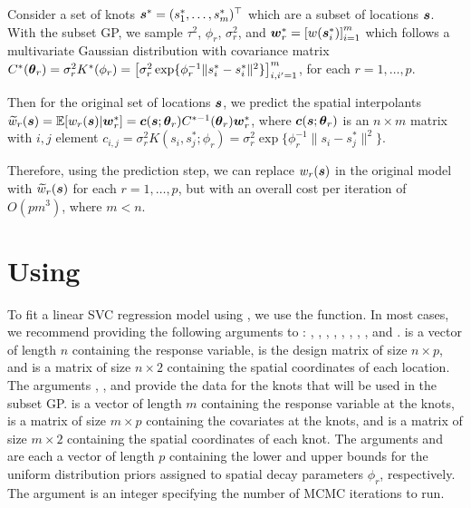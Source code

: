 Consider a set of knots $\boldsymbol{s}^* = (s_1^*, \dots, s_m^*)^\top$ which are a subset of locations $\boldsymbol{s}$. With the subset GP, we sample $\tau^2$, $\phi_r$, $\sigma_r^2$, and $\boldsymbol{w}_r^* = \left[w(\boldsymbol{s}_i^*)\right]_{i=1}^m$ which follows a multivariate Gaussian distribution with covariance matrix $C^*(\boldsymbol{\theta}_r) = \sigma_r^2 K^*(\phi_r) = \left[ \sigma_r^2 \exp\{ \phi_r^{-1} \| s_{i}^* - s_{i}^* \|^2 \} \right]_{i, i' = 1}^m$, for each $r = 1, \dots, p$.

Then for the original set of locations $\boldsymbol{s}$, we predict the spatial interpolants $\widetilde{w}_r(\boldsymbol{s}) = \mathbb{E}[w_r(\boldsymbol{s})|\boldsymbol{w}_r^*] = \boldsymbol{c} (\boldsymbol{s}; \boldsymbol{\theta}_r) C^{*-1}(\boldsymbol{\theta}_r)\boldsymbol{w}_r^*$, where $\boldsymbol{c} (\boldsymbol{s}; \boldsymbol{\theta}_r)$ is an $n \times m$ matrix with $i, j$ element $c_{i, j} = \sigma_r^2 K(s_i, s_j^*; \phi_r) = \sigma_r^2 \exp\{\phi_r^{-1}\|s_i-s_j^*\|^2\}$.

Therefore, using the prediction step, we can replace $w_r(\boldsymbol{s})$ in the original model with $\widetilde{w}_r(\boldsymbol{s})$ for each $r = 1, \dots, p$, but with an overall cost per iteration of $O(pm^3)$, where $m < n$.

\section{Using }
\label{sec:using}

To fit a linear SVC regression model using , we use the  function. In most cases, we recommend providing the following arguments to : , , , , , , , , and .  is a vector of length $n$ containing the response variable,  is the design matrix of size $n \times p$, and  is a matrix of size $n \times 2$ containing the spatial coordinates of each location. The arguments , , and  provide the data for the knots that will be used in the subset GP.  is a vector of length $m$ containing the response variable at the knots,  is a matrix of size $m \times p$ containing the covariates at the knots, and  is a matrix of size $m \times 2$ containing the spatial coordinates of each knot. The arguments  and  are each a vector of length $p$ containing the lower and upper bounds for the uniform distribution priors assigned to spatial decay parameters $\phi_r$, respectively. The argument  is an integer specifying the number of MCMC iterations to run.

